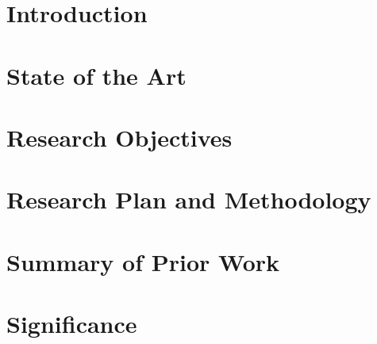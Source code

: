\documentclass[]{llncs}
\begin{document}
\section{Introduction}\label{introduction}
	
\section{State of the Art}\label{stateOfTheArt}
	
\section{Research Objectives}\label{objectives}
	
\section{Research Plan and Methodology}\label{planAndMethod}
	
\section{Summary of Prior Work}\label{priorWork}
	
\section{Significance}\label{significance}
	



\end{document}
